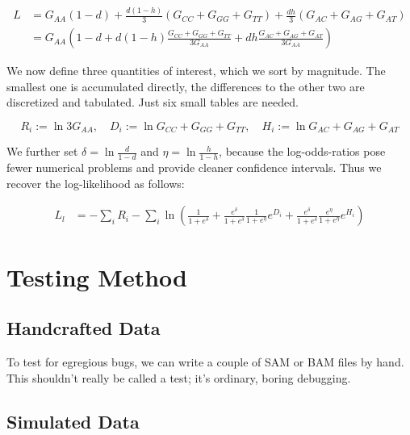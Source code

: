 \documentclass{article}
\begin{document}
\begin{align*}
L &= G_{AA} \left( 1-d \right) + \frac{d(1-h)}{3} \left( G_{CC} + G_{GG} + G_{TT} \right)
          + \frac{dh}{3} \left( G_{AC} + G_{AG} + G_{AT} \right) \\
  &= G_{AA} \left( 1-d + d(1-h) \frac{G_{CC} + G_{GG} + G_{TT}}{3 G_{AA}}
          + dh \frac{G_{AC} + G_{AG} + G_{AT}}{3 G_{AA}} \right)
\end{align*}

We now define three quantities of interest, which we sort by magnitude.
The smallest one is accumulated directly, the differences to the other
two are discretized and tabulated.  Just six small tables are needed.

\begin{equation*}
R_i := \ln 3 G_{AA}, \quad
D_i := \ln G_{CC} + G_{GG} + G_{TT}, \quad
H_i := \ln G_{AC} + G_{AG} + G_{AT} 
\end{equation*}

We further set $\delta = \ln \frac{d}{1-d}$ and $\eta = \ln
\frac{h}{1-h}$, because the log-odds-ratios pose fewer numerical
problems and provide cleaner confidence intervals.  Thus we recover the
log-likelihood as follows:

\begin{align*}
L_l &= - \sum_{i} R_i - \sum_{i} \ln \left( \frac{1}{1+e^\delta} +
    \frac{e^\delta}{1+e^\delta} \frac{1}{1+e^\eta} e^{D_i} +
    \frac{e^\delta}{1+e^\delta} \frac{e^\eta}{1+e^\eta} e^{H_i} \right)
\end{align*}


\section{Testing Method}

\subsection{Handcrafted Data}

To test for egregious bugs, we can write a couple of SAM or BAM files by
hand.  This shouldn't really be called a test; it's ordinary, boring
debugging.


\subsection{Simulated Data}
\end{document}
